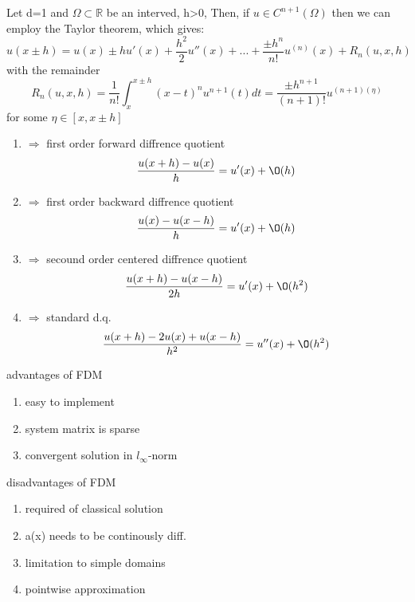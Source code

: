 \documentclass[ngerman]{article}
\theoremstyle{definition}
\theoremstyle{remark}
\newcommand{\f}[2]{\frac{#1}{#2}}							%
\newcommand{\RR}{\mathbb{R}}			%
\newcommand{\OO}{\Omega}
\newcommand{\drw}{\Rightarrow}			%
\begin{document}
Let d=1 and $\OO\subset \RR$ be an interved, h>0, Then, if $u \in C^{n+1}(\OO)$ then we can employ the  Taylor theorem, which gives:
$$u(x\pm h) = u(x)\pm hu'(x) + \f{h^2}{2}u''(x) + ...+\f{\pm h^n}{n!}u^{(n)}(x)+ R_n(u,x,h)$$
with the remainder 
$$R_n(u,x,h)=\f{1}{n!}\int^{x\pm h}_x (x-t)^n u ^{n+1}(t)dt= \f{\pm h^{n+1}}{(n+1)!} u^{(n+1)(\eta)}$$
for some $\eta \in [x,x\pm h]$\\
\begin{enumerate}
\item $\drw$ first order forward diffrence quotient\\
  $$\f{u(x+h) -u(x)}{h}= u'(x) + \O(h)$$
\item $\drw$ first order backward diffrence quotient\\
  $$\f{u(x) -u(x-h)}{h}= u'(x) + \O(h)$$
\item $\drw$ secound order centered diffrence quotient\\
  $$\f{u(x+h) -u(x-h)}{2h}= u'(x) + \O(h^2)$$
\item $\drw$ standard d.q.\\
  $$\f{u(x+h) -2u(x) +u(x-h)}{h^2}= u''(x) + \O(h^2)$$
\end{enumerate}
advantages of FDM
\begin{enumerate}
\item easy to implement
\item system matrix is sparse
\item convergent solution in $l_\infty$-norm
\end{enumerate}
disadvantages of FDM
\begin{enumerate}
\item required of classical solution
\item a(x) needs to be continously diff.
\item limitation to simple domains
\item pointwise approximation
\end{enumerate}
\end{document}
